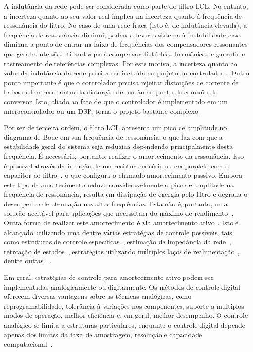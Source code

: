 	A indutância da rede pode ser considerada como parte do filtro LCL. No entanto, a incerteza quanto ao seu valor real implica na incerteza quanto à frequência de ressonância do filtro. No caso de uma rede fraca (isto é, de indutância elevada), a frequência de ressonância diminui, podendo levar o sistema à instabilidade caso diminua a ponto de entrar na faixa de frequências dos compensadores ressonantes que geralmente são utilizados para compensar distúrbios harmônicos e garantir o rastreamento de referências complexas. Por este motivo, a incerteza quanto ao valor da indutância da rede precisa ser incluída no projeto do controlador~\cite{ref:LISERRE}. Outro ponto importante é que o controlador precisa rejeitar distorções de corrente de baixa ordem resultantes da distorção de tensão no ponto de conexão do conversor. Isto, aliado ao fato de que o controlador é implementado em um microcontrolador ou um DSP, torna o projeto bastante complexo.

	Por ser de terceira ordem, o filtro LCL apresenta um pico de amplitude no diagrama de Bode em sua frequência de ressonância, o que faz com que a estabilidade geral do sistema seja reduzida dependendo principalmente desta frequência. É necessário, portanto, realizar o amortecimento da ressonância. Isso é possível através da inserção de um resistor em série ou em paralelo com o capacitor do filtro~\cite{ref:AHMED}, o que configura o chamado amortecimento passivo. Embora este tipo de amortecimento reduza consideravelmente o pico de amplitude na frequência de ressonância, resulta em dissipação de energia pelo filtro e degrada o desempenho de atenuação nas altas frequências. Esta não é, portanto, uma solução aceitável para aplicações que necessitam do máximo de rendimento~\cite{ref:SHEN}. Outra forma de realizar este amortecimento é via amortecimento ativo~\cite{ref:GERVASIO}. Isto é alcançado utilizando uma dentre várias estratégias de controle possíveis, tais como estruturas de controle específicas~\cite{ref:WU}, estimação de impedância da rede~\cite{ref:BLAABJERG}, retroação de estados~\cite{ref:MASSING}, estratégias utilizando múltiplos laços de realimentação~\cite{ref:POH}, dentre outras~\cite{ref:WESSELS} \cite{ref:MORENO} \cite{ref:YANG}.

	Em geral, estratégias de controle para amortecimento ativo podem ser implementadas analogicamente ou digitalmente. Os métodos de controle digital oferecem diversas vantagens sobre as técnicas analógicas, como reprogramabilidade, tolerância à variações nos componentes, suporte a multiplos modos de operação, melhor eficiência e, em geral, melhor desempenho. O controle analógico se limita a estruturas particulares, enquanto o controle digital depende apenas dos limites da taxa de amostragem, resolução e capacidade computacional~\cite{ref:KIMBALL}.

